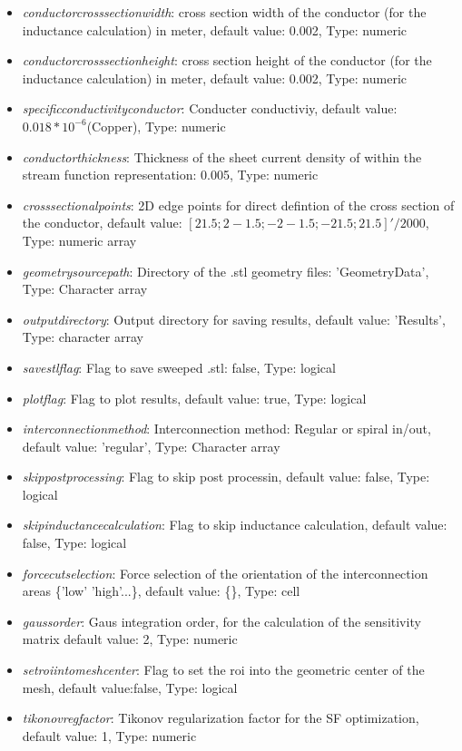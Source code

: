 \documentclass[a4paper,12pt]{book}
\begin{document}
\begin{itemize}
	\item  \textit{conductor\textunderscore cross\textunderscore section\textunderscore width}: cross section width of the conductor (for the inductance calculation) in meter, default value: 0.002, Type: numeric
	\item  \textit{conductor\textunderscore cross\textunderscore section\textunderscore height}: cross section height of the conductor (for the inductance calculation) in meter, default value: 0.002, Type: numeric
	\item  \textit{specific\textunderscore conductivity\textunderscore conductor}: Conducter conductiviy, default value:$  0.018*10^{-6}  $(Copper), Type: numeric
	\item  \textit{conductor\textunderscore thickness}: Thickness of the sheet current density of within the stream function representation: 0.005, Type: numeric
	\item  \textit{cross\textunderscore sectional\textunderscore points}: 2D edge points for direct defintion of the cross section of the conductor, default value: $ [2 1.5 ;2 -1.5; -2 -1.5; -2 1.5; 2 1.5 ]'/2000 $, Type: numeric array
	\item  \textit{geometry\textunderscore source\textunderscore path}: Directory of the .stl  geometry files: 'Geometry\textunderscore Data', Type: Character array
	\item  \textit{output\textunderscore directory}: Output directory for saving results, default value: 'Results', Type: character array
	\item  \textit{save\textunderscore stl\textunderscore flag}: Flag to save sweeped .stl: false, Type: logical
	\item  \textit{plot\textunderscore flag}: Flag to plot results, default value: true, Type: logical
	\item  \textit{interconnection\textunderscore method}: Interconnection method: Regular or spiral in/out, default value: 'regular', Type: Character array
	\item  \textit{skip\textunderscore postprocessing}: Flag to skip post processin, default value: false, Type: logical
	\item  \textit{skip\textunderscore inductance\textunderscore calculation}: Flag to skip inductance calculation, default value: false, Type: logical
	\item  \textit{force\textunderscore cut\textunderscore selection}: Force selection of the orientation of the interconnection areas \{'low' 'high'...\}, default value: \{\}, Type: cell
	\item  \textit{gauss\textunderscore order}: Gaus integration order, for the calculation of the sensitivity matrix default value: 2, Type: numeric
	\item  \textit{set\textunderscore roi\textunderscore into\textunderscore mesh\textunderscore center}: Flag to set the roi into the geometric center of the mesh, default value:false, Type: logical
	\item  \textit{tikonov\textunderscore reg\textunderscore factor}: Tikonov regularization factor for the SF optimization, default value: 1, Type: numeric
														
\end{itemize}
\end{document}
